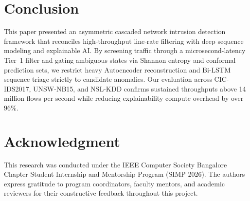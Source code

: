 \documentclass[conference]{IEEEtran}
\begin{document}
\section{Conclusion}
This paper presented an asymmetric cascaded network intrusion detection framework that reconciles high-throughput line-rate filtering with deep sequence modeling and explainable AI. By screening traffic through a microsecond-latency Tier~1 filter and gating ambiguous states via Shannon entropy and conformal prediction sets, we restrict heavy Autoencoder reconstruction and Bi-LSTM sequence triage strictly to candidate anomalies. Our evaluation across CIC-IDS2017, UNSW-NB15, and NSL-KDD confirms sustained throughputs above 14 million flows per second while reducing explainability compute overhead by over $96\%$.

\section*{Acknowledgment}
This research was conducted under the IEEE Computer Society Bangalore Chapter Student Internship and Mentorship Program (SIMP 2026). The authors express gratitude to program coordinators, faculty mentors, and academic reviewers for their constructive feedback throughout this project.
\end{document}
